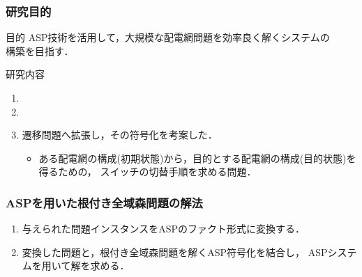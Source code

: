 \documentclass[dvipdfmx,11pt]{beamer}
\begin{document}
\begin{frame}\frametitle{研究目的}
 \begin{alertblock}{目的}
  ASP技術を活用して，大規模な配電網問題を効率良く解くシステムの\\構築を目指す．
 \end{alertblock}

 \begin{block}{研究内容}
  \begin{enumerate}
   \item {}
   \item {}
   \item 遷移問題へ拡張し，その符号化を考案した．
   \begin{itemize}
	\item ある配電網の構成(初期状態)から，目的とする配電網の構成(目的状態)を得るための，
		  スイッチの切替手順を求める問題．
   \end{itemize}
  \end{enumerate}
  
 \end{block}
 
\end{frame}

\begin{frame}\frametitle{ASPを用いた根付き全域森問題の解法}
 
 \begin{figure}[htbp]
  \centering
  
 \end{figure}

 \vspace{-0.5cm}
 \begin{exampleblock}{}
  \begin{enumerate}
   \item 与えられた問題インスタンスをASPのファクト形式に変換する．
   \item 変換した問題と，根付き全域森問題を解くASP符号化を結合し，
		 ASPシステムを用いて解を求める．
  \end{enumerate}
 \end{exampleblock}
\end{frame}
\end{document}

